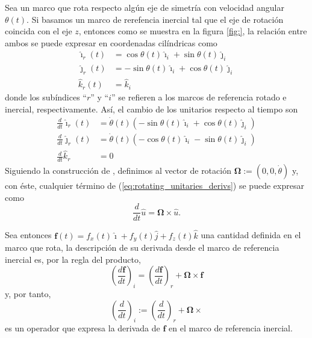 Sea un marco que rota respecto algún eje de simetría con velocidad angular $\theta(t)$. Si basamos un marco de rerefencia inercial tal que el eje de rotación coincida con el eje $z$, entonces como se muestra en la figura \ref{fig:}, la relación entre ambos se puede expresar en coordenadas cilíndricas como
\begin{align}
 \hat{\imath}_r(t) &= \cos \theta(t) \hat{\imath}_i + \sin \theta(t) \hat{\jmath}_i \nonumber \\
 \hat{\jmath}_r(t) &= -\sin \theta(t) \hat{\imath}_i + \cos \theta(t) \hat{\jmath}_i \\
 \hat{k}_r(t) &= \hat{k}_i \nonumber
 \label{eq:rotating_unitaries}
\end{align}
donde los subíndices ``$r$'' y ``$i$'' se refieren a los marcos de referencia rotado e inercial, respectivamente. Así, el cambio de los unitarios respecto al tiempo son
\begin{align}
 \frac{d}{dt} \hat{\imath}_r(t) &= \dot{\theta}(t) \left( -\sin \theta(t) \hat{\imath}_i + \cos \theta(t) \hat{\jmath}_i  \right) \nonumber \\
 \frac{d}{dt} \hat{\jmath}_r(t) &= \dot{\theta}(t) \left( -\cos \theta(t) \hat{\imath}_i - \sin \theta(t) \hat{\jmath}_i \right) \\
 \frac{d}{dt} \hat{k}_r &= 0 \nonumber 
 \label{eq:rotating_unitaries_derivs}
\end{align}
Siguiendo la construcción de \cite{wiki_rotating_frame}, definimos al vector de rotación $\mathbf{\Omega} := \left( 0, 0, \dot{\theta} \right)$ y, con éste, cualquier término de (\ref{eq:rotating_unitaries_derivs}) se puede expresar como 
\begin{equation}
 \frac{d}{dt}\hat{u} = \mathbf{\Omega} \times \hat{u}.
\end{equation}

Sea entonces $\mathbf{f}(t) = f_x(t) \hat{\imath} + f_y(t) \hat{j} + f_z(t) \hat{k}$ una cantidad definida en el marco que rota, la descripción de su derivada desde el marco de referencia inercial es, por la regla del producto,
\begin{equation*}
 \left( \frac{d \mathbf{f}}{dt} \right)_i = \left( \frac{d\mathbf{f}}{dt} \right)_r  + \mathbf{\Omega} \times \mathbf{f}
\end{equation*}
y, por tanto,
\begin{equation}
 \left(\frac{d}{dt}\right)_i := \left( \frac{d}{dt} \right)_r + \mathbf{\Omega} \times
 \label{eq:rotating_derivative}
\end{equation}
es un operador que expresa la derivada de $\mathbf{f}$ en el marco de referencia inercial.

